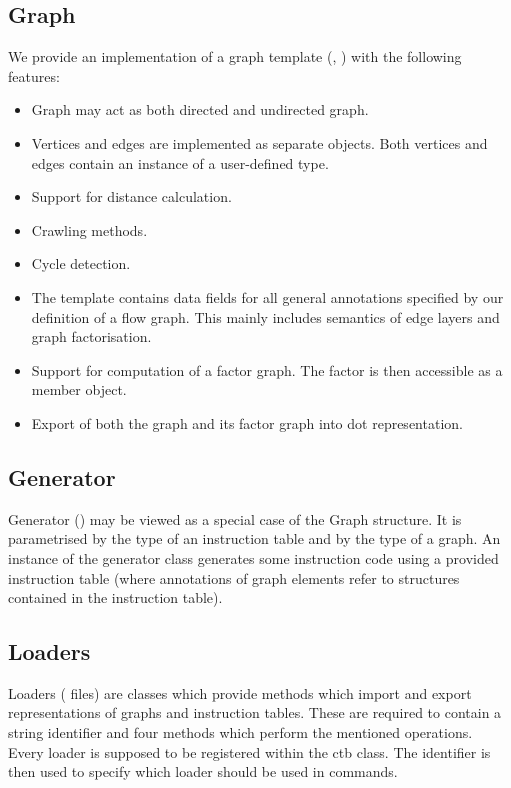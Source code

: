 \subsection*{Graph}

  We provide an implementation of a graph template (, ) with the following features:

  \begin{itemize}
    \item Graph may act as both directed and undirected graph.
    \item Vertices and edges are implemented as separate objects. Both vertices and edges contain an instance of a user-defined type. 
    \item Support for distance calculation.
    \item Crawling methods.
    \item Cycle detection.
    \item The template contains data fields for all general annotations specified by our definition of a flow graph. This mainly includes semantics of edge layers and graph factorisation.
    \item Support for computation of a factor graph. The factor is then accessible as a member object.
    \item Export of both the graph and its factor graph into dot representation. 
  \end{itemize}

\subsection*{Generator}
  Generator () may be viewed as a special case of the Graph structure. It is parametrised by the type of an instruction table and by the type of a graph. An instance of the generator class generates some instruction code using a provided instruction table (where annotations of graph elements refer to structures contained in the instruction table). 

\subsection*{Loaders}
  Loaders ( files) are classes which provide methods which import and export representations of graphs and instruction tables. These are required to contain a string identifier and four methods which perform the mentioned operations. Every loader is supposed to be registered within the ctb class. The identifier is then used to specify which loader should be used in commands. 

